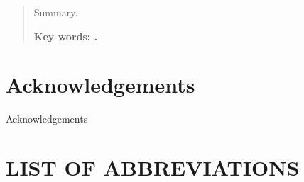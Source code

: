 \documentclass[11pt]{report} %
\begin{document}
\newpage %
\thispagestyle{empty}
\mbox{}

\renewcommand\abstractname{\large\bfseries\filcenter\uppercase{Abstract}}
\begin{abstract}
\thispagestyle{plain}
\setcounter{page}{3}
	
	Summary.\medskip
	
	
	\textbf{Key words: .}
	
	\vfill
\end{abstract}
	\newpage %
	\thispagestyle{empty}
	\mbox{}


\chapter*{Acknowledgements}

\setcounter{page}{5}
	
Acknowledgements
	
		
		
	\vfill
	
	\newpage %
	\thispagestyle{empty}
	\mbox{}
	


\tableofcontents
\thispagestyle{fancy}

\newpage %
\thispagestyle{empty}
\mbox{}

\listoffigures
\thispagestyle{fancy}

\newpage %
\thispagestyle{empty}
\mbox{}

\listoftables
\thispagestyle{fancy}

\newpage %
\thispagestyle{empty}
\mbox{}

\chapter*{LIST OF ABBREVIATIONS}
\thispagestyle{fancy}

\end{document}
